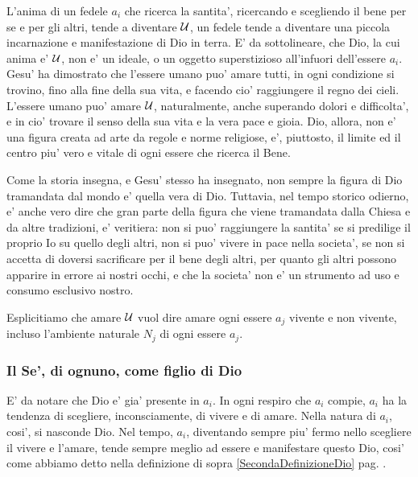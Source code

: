 L'anima di un fedele $a_i$ che ricerca la santita', ricercando e scegliendo il bene per se e per gli altri, tende a diventare $\mathcal{U}$, un fedele tende a diventare una piccola incarnazione e manifestazione di Dio in terra. E' da sottolineare, che Dio, la cui anima e' $\mathcal{U}$, non e' un ideale, o un oggetto superstizioso all'infuori dell'essere $a_i$. Gesu' ha dimostrato che l'essere umano puo' amare tutti, in ogni condizione si trovino, fino alla fine della sua vita, e facendo cio' raggiungere il regno dei cieli. L'essere umano puo' amare $\mathcal{U}$, naturalmente, anche superando dolori e difficolta', e in cio' trovare il senso della sua vita e la vera pace e gioia. Dio, allora, non e' una figura creata ad arte da regole e norme religiose, e', piuttosto, il limite ed il centro piu' vero e vitale di ogni essere che ricerca il Bene. 

Come la storia insegna, e Gesu' stesso ha insegnato, non sempre la figura di Dio tramandata dal mondo e' quella vera di Dio. Tuttavia, nel tempo storico odierno, e' anche vero dire che gran parte della figura che viene tramandata dalla Chiesa e da altre tradizioni, e' veritiera: non si puo' raggiungere la santita' se si predilige il proprio Io su quello degli altri, non si puo' vivere in pace nella societa',  se non si accetta di doversi sacrificare per il bene degli altri, per quanto gli altri possono apparire in errore ai nostri occhi, e che la societa' non e' un strumento ad uso e consumo esclusivo nostro.

Esplicitiamo che amare $\mathcal{U}$ vuol dire amare ogni essere $a_j$ vivente e non vivente, incluso l'ambiente naturale $N_j$ di ogni essere $a_j$. 

\subsubsection{Il Se', di ognuno, come figlio di Dio}
E' da notare che Dio e' gia' presente in $a_i$. In ogni respiro che $a_i$ compie, $a_i$ ha la tendenza di scegliere, inconsciamente, di vivere e di amare. Nella natura di $a_i$, cosi', si nasconde Dio. Nel tempo, $a_i$, diventando sempre piu' fermo nello scegliere il vivere e l'amare, tende sempre meglio ad essere e manifestare questo Dio, cosi' come abbiamo detto nella definizione di sopra \ref{SecondaDefinizioneDio} pag. \pageref{SecondaDefinizioneDio}.

